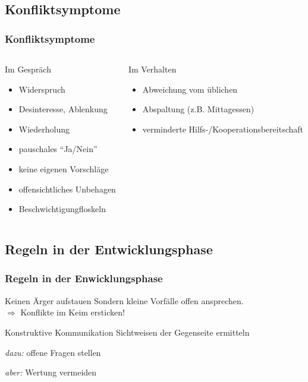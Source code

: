 \documentclass[
	ngerman,
	xcolor=dvipsnames,
	11pt
	]{beamer}
\begin{document}
\subsection{Konfliktsymptome}
\begin{frame}
	\frametitle{Konfliktsymptome}
	\begin{columns}[t]
		\begin{block}{Im Gespräch}
			\begin{itemize}
				\item Widerspruch
				\item Desinteresse, Ablenkung
				\item Wiederholung
				\item pauschales ``Ja/Nein''
				\item keine eigenen Vorschläge
				\item offensichtliches Unbehagen
				\item Beschwichtigungfloskeln
			\end{itemize}
		\end{block}
		\pause

		\begin{block}{Im Verhalten}
			\begin{itemize}
				\item Abweichung vom üblichen
				\item Abspaltung (z.B. Mittagessen)
				\item verminderte Hilfs-/Kooperationsbereitschaft
			\end{itemize}
		\end{block}
	\end{columns}
\end{frame}

\subsection{Regeln in der Entwicklungsphase}
\begin{frame}
	\frametitle{Regeln in der Enwicklungsphase}
	\begin{alertblock}{Keinen Ärger aufstauen}
		Sondern kleine Vorfälle offen ansprechen.\\
		$\Rightarrow$ Konflikte im Keim ersticken!
	\end{alertblock}

	\begin{block}{Konstruktive Kommunikation}
		Sichtweisen der Gegenseite ermitteln
		\begin{description}
			\item \textit{dazu:} offene Fragen stellen
			\item \textit{aber:} Wertung vermeiden
		\end{description}
	\end{block}
\end{frame}
\end{document}
